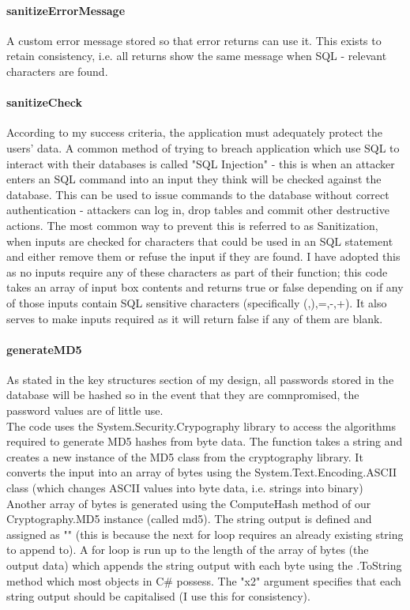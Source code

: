 ﻿\documentclass{article}
\begin{document}
    \paragraph{sanitizeErrorMessage}
    A custom error message stored so that error returns can use it.
    This exists to retain consistency, i.e. all returns show the same message when SQL - relevant characters are found.
    \paragraph{sanitizeCheck}
    According to my success criteria, the application must adequately protect the users' data.
    A common method of trying to breach application which use SQL to interact with their databases is called "SQL Injection" - this is when an attacker enters an SQL command into an input they think will be checked against the database.
    This can be used to issue commands to the database without correct authentication - attackers can log in, drop tables and commit other destructive actions.
    The most common way to prevent this is referred to as Sanitization, when inputs are checked for characters that could be used in an SQL statement and either remove them or refuse the input if they are found.
    I have adopted this as no inputs require any of these characters as part of their function; this code takes an array of input box contents and returns true or false depending on if any of those inputs contain SQL sensitive characters (specifically (,),=,-,+).
    It also serves to make inputs required as it will return false if any of them are blank.
    \paragraph{generateMD5}
    As stated in the key structures section of my design, all passwords stored in the database will be hashed so in the event that they are comnpromised, the password values are of little use.
    \\
    The code uses the System.Security.Crypography library to access the algorithms required to generate MD5 hashes from byte data.
    The function takes a string and creates a new instance of the MD5 class from the cryptography library.
    It converts the input into an array of bytes using the System.Text.Encoding.ASCII class (which changes ASCII values into byte data, i.e. strings into binary)
    Another array of bytes is generated using the ComputeHash method of our Cryptography.MD5 instance (called md5).
    The string output is defined and assigned as "" (this is because the next for loop requires an already existing string to append to).
    A for loop is run up to the length of the array of bytes (the output data) which appends the string output with each byte using the .ToString method which most objects in C\# possess.
    The "x2" argument specifies that each string output should be capitalised (I use this for consistency).
    \newpage
\end{document}
